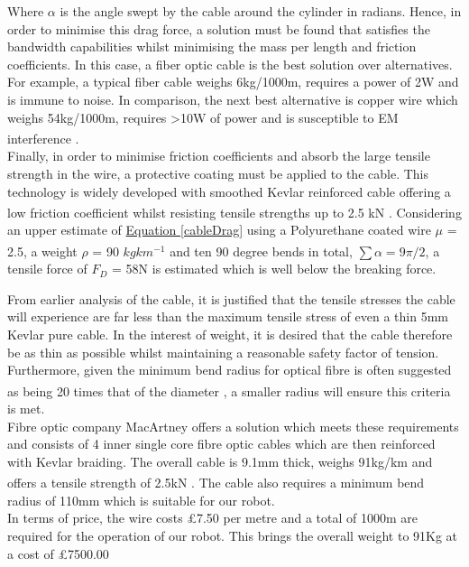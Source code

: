 \documentclass[11pt]{article}		%
\newcommand{\supercite}[1]{\textsuperscript{\cite{#1}}}		%
\newcommand{\equationref}[1]{\hyperref[#1]{Equation \ref*{#1}}}     %
\begin{document}
			Where $\alpha$ is the angle swept by the cable around the cylinder in radians. 
		    Hence, in order to minimise this drag force, a solution must be found that satisfies the bandwidth capabilities whilst minimising the mass per length and friction coefficients.  
		    In this case, a fiber optic cable is the best solution over alternatives. 
		    For example, a typical fiber cable weighs 6kg/1000m, requires a power of 2W and is immune to noise. 
		    In comparison, the next best alternative is copper wire which weighs 54kg/1000m, requires >10W of power and is susceptible to EM interference \supercite{wiring}.
		    \\
	        Finally, in order to minimise friction coefficients and absorb the large tensile strength in the wire, a protective coating must be applied to the cable. 
		    This technology is widely developed with smoothed Kevlar reinforced cable offering a low friction coefficient whilst resisting tensile strengths up to 2.5 kN \supercite{macartney}. 
		    Considering an upper estimate of \equationref{cableDrag} using a Polyurethane coated wire $\mu$ = 2.5, a weight $\rho$ = 90 $kgkm^{-1}$ \supercite{macartney} and ten 90 degree bends in total, $\sum \alpha = 9\pi/2$, a tensile force of $F_D$ = 58N is estimated which is well below the breaking force.  
		    
		    From earlier analysis of the cable, it is justified that the tensile stresses the cable will experience are far less than the maximum tensile stress of even a thin 5mm Kevlar pure cable. In the interest of weight, it is desired that the cable therefore be as thin as possible whilst maintaining a reasonable safety factor of tension. Furthermore, given the minimum bend radius for optical fibre is often suggested as being 20 times that of the diameter \supercite{fibrebend}, a smaller radius will ensure this criteria is met.\\
  	    	\hspace*{3ex}Fibre optic company MacArtney offers a solution which meets these requirements and consists of 4 inner single core fibre optic cables which are then reinforced with Kevlar braiding. The overall cable is 9.1mm thick, weighs 91kg/km and offers a tensile strength of 2.5kN \supercite{macartney}. The cable also requires a minimum bend radius of 110mm which is suitable for our robot. \\
  	    	\hspace*{3ex}In terms of price, the wire costs £7.50 per metre and a total of 1000m are required for the operation of our robot. This brings the overall weight to 91Kg at a cost of £7500.00 
		    	    	
\end{document}
